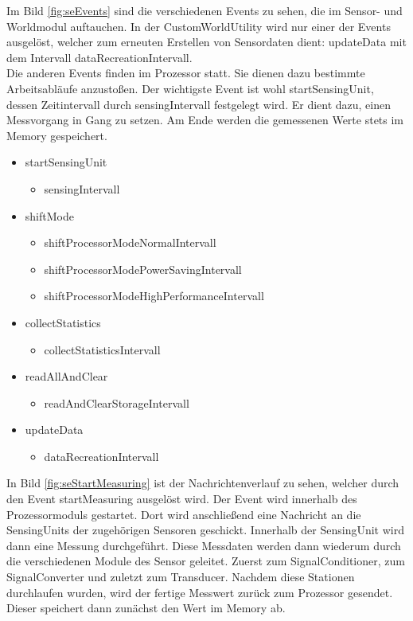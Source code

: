 Im Bild \ref{fig:seEvents} sind die verschiedenen Events zu sehen, die im Sensor- und Worldmodul auftauchen. In der CustomWorldUtility wird nur einer der Events ausgelöst, welcher zum erneuten Erstellen von Sensordaten dient: updateData mit dem Intervall dataRecreationIntervall.\\
Die anderen Events finden im Prozessor statt. Sie dienen dazu bestimmte Arbeitsabläufe anzustoßen. Der wichtigste Event ist wohl startSensingUnit, dessen Zeitintervall durch sensingIntervall festgelegt wird. Er dient dazu, einen Messvorgang in Gang zu setzen. Am Ende werden die gemessenen Werte stets im Memory gespeichert.

\begin{itemize}
\item startSensingUnit
\begin{itemize}
\item sensingIntervall
\end{itemize}
\item shiftMode
\begin{itemize}
\item shiftProcessorModeNormalIntervall
\item shiftProcessorModePowerSavingIntervall
\item shiftProcessorModeHighPerformanceIntervall
\end{itemize}
\item collectStatistics
\begin{itemize}
\item collectStatisticsIntervall
\end{itemize}
\item readAllAndClear
\begin{itemize}
\item readAndClearStorageIntervall
\end{itemize}
\item updateData
\begin{itemize}
\item dataRecreationIntervall
\end{itemize}
\end{itemize}

In Bild \ref{fig:seStartMeasuring} ist der Nachrichtenverlauf zu sehen, welcher durch den Event startMeasuring ausgelöst wird. Der Event wird innerhalb des Prozessormoduls gestartet. Dort wird anschließend eine Nachricht an die SensingUnits der zugehörigen Sensoren geschickt. Innerhalb der SensingUnit wird dann eine Messung durchgeführt. Diese Messdaten werden dann wiederum durch die verschiedenen Module des Sensor geleitet. Zuerst zum SignalConditioner, zum SignalConverter und zuletzt zum Transducer. Nachdem diese Stationen durchlaufen wurden, wird der fertige Messwert zurück zum Prozessor gesendet. Dieser speichert dann zunächst den Wert im Memory ab.

